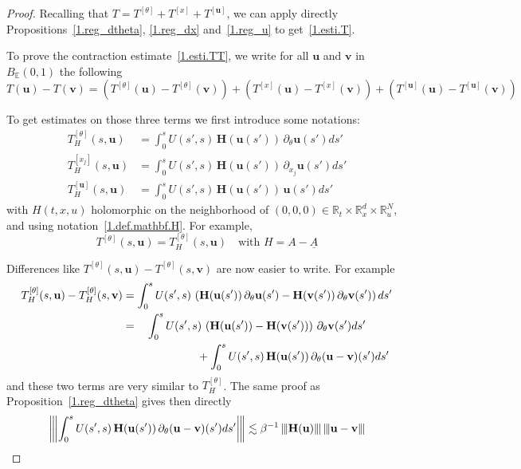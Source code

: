 \documentclass[10pt]{amsart}
\theoremstyle{definition}
\theoremstyle{plain}
\newcommand*\R{{\mathbb R}}
\newcommand{\dptl}{\partial}%
\newcommand*\EE{{\mathbb E}}
\newcommand{\ubf}{{\mathbf u}}
\newcommand{\vbf}{{\mathbf v}}
\newcommand{\Hbf}{{\mathbf H}}
\newcommand*\und{\underline}
\DeclarePairedDelimiter{\VERT}{|\mkern -1.6mu|\mkern -1.6mu|}{|\mkern -1.6mu|\mkern -1.6mu|}
\begin{document}
\begin{proof}
Recalling that $T = T^{[\theta]} + T^{[x]} + T^{[\ubf]}$, we can apply directly Propositions~\ref{1.reg_dtheta}, \ref{1.reg_dx} and~\ref{1.reg_u} to get~\eqref{1.esti.T}.

To prove the contraction estimate~\eqref{1.esti.TT}, we write for all $\ubf$ and $\vbf$ in $B_{\EE}(0,1)$ the following
\[
T(\ubf) - T(\vbf) = \left(T^{[\theta]}(\ubf)-T^{[\theta]}(\vbf)\right) + \left(T^{[x]}(\ubf)-T^{[x]}(\vbf)\right) + \left(T^{[\ubf]}(\ubf)- T^{[\ubf]}(\vbf)\right)
\]

To get estimates on those three terms we first introduce some notations:
\begin{align*}
T_{H}^{[\theta]}(s,\ubf) & = \int_{0}^{s} U(s',s) \,\Hbf(\ubf(s')) \,\dptl_{\theta} \ubf(s') ds' \\
T_{H}^{[x_j]}(s,\ubf) & = \int_{0}^{s} U(s',s)\, \Hbf(\ubf(s')) \, \dptl_{x_j} \ubf(s') ds' \\
T_{H}^{[\ubf]}(s,\ubf) & = \int_{0}^{s} U(s',s) \, \Hbf(\ubf(s')) \, \ubf(s') ds'
\end{align*}
with $H(t,x,u)$ holomorphic on the neighborhood of $(0,0,0)\in\R_{t}\times\R_{x}^{d}\times\R_{u}^{N}$, and using notation~\eqref{1.def.mathbf.H}. For example,
\begin{equation}\label{1.T_H_theta}
T^{[\theta]}(s,\ubf) = T_{H}^{[\theta]}(s,\ubf) \quad \text{with } H = A - \und{A}
\end{equation}


Differences like $T^{[\theta]}(s,\ubf) - T^{[\theta]}(s,\vbf)$ are now easier to write. For example
\begin{equation}\label{1.one}
\begin{aligned}
T_{H}^{[\theta]}(s,\ubf) - T_{H}^{[\theta]}(s,\vbf) & = \int_{0}^{s} U(s',s) \,\left(\Hbf(\ubf(s')) \,\dptl_{\theta} \ubf(s') - \Hbf(\vbf(s')) \,\dptl_{\theta} \vbf(s') \right) ds' \\
& = \phantom{+}\int_{0}^{s} U(s',s) \,\left(\Hbf(\ubf(s')) - \Hbf(\vbf(s'))\right) \,\dptl_{\theta} \vbf(s') ds' 
\\
& \mkern 120mu+ \int_{0}^{s} U(s',s) \,\Hbf(\ubf(s')) \,\dptl_{\theta} (\ubf-\vbf)(s') ds'
\end{aligned}
\end{equation}
and these two terms are very similar to $T_{H}^{[\theta]}$. The same proof as Proposition~\ref{1.reg_dtheta} gives then directly
\[
\left|\mkern -1.6mu\left|\mkern -1.6mu\left| \int_{0}^{s} U(s',s) \,\Hbf(\ubf(s')) \,\dptl_{\theta} (\ubf-\vbf)(s') ds' \right|\mkern -1.6mu\right|\mkern -1.6mu\right| \lesssim \beta^{-1} \,\VERT{\Hbf(\ubf)}\, \VERT{\ubf - \vbf}
\]



\end{proof}
\end{document}
